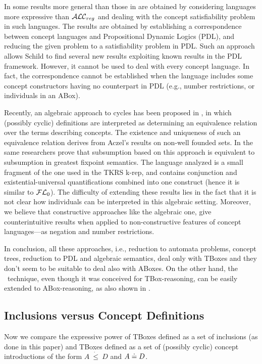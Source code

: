 In \cite{Schi91} some results more general than those in \cite{Baad90b} are
obtained by considering languages more expressive than ${\cal ALC}_{reg}$ and dealing
with the concept satisfiability problem in such languages.  The results are
obtained by establishing a correspondence between concept languages and
Propositional Dynamic Logics (PDL), and reducing the given problem to a
satisfiability problem in PDL.  Such an approach allows Schild to find several
new results exploiting known results in the PDL framework. However, it cannot
be used to deal with every concept language.  In fact, the correspondence
cannot be established when the language includes some concept constructors
having no counterpart in PDL (e.g., number restrictions, or individuals in an
ABox).

Recently, an algebraic approach to cycles has been proposed in \cite{DiMO92},
in which (possibly cyclic) definitions are interpreted as determining an
equivalence relation over the terms describing concepts. The existence and
uniqueness of such an equivalence relation derives from Aczel's results on
non-well founded sets. In \cite{DiMO93} the same researchers prove that
subsumption based on this approach is equivalent to subsumption in greatest
fixpoint semantics.  The language analyzed is a small fragment of the one used
in the TKRS {\sc k-rep}, and contains conjunction and existential-universal
quantifications combined into one construct (hence it is similar to ${\cal
FL}_0$). The difficulty of extending these results lies in the fact that
it is not clear how individuals can be interpreted in this algebraic setting.
Moreover, we believe that constructive approaches like the algebraic one, give
counterintuitive results when applied to non-constructive features of concept
languages---as negation and number restrictions.

In conclusion, all these approaches, i.e., reduction to automata problems,
concept trees, reduction to PDL and algebraic semantics,
deal only with TBoxes and they don't seem to be suitable to deal also
with ABoxes. On the other hand, the \cs\ technique, even though it was 
conceived for TBox-reasoning, can be easily extended to ABox-reasoning, 
as also shown in \cite{Holl90,BaHo91,DLNS93}.

\subsection{Inclusions versus Concept Definitions}

Now we compare the expressive power of TBoxes defined as a
set of inclusions (as done in this paper) and TBoxes defined as a set of
(possibly cyclic) concept introductions of the form $A ~\dot\leq~ D$ and $A\doteq D$. 

